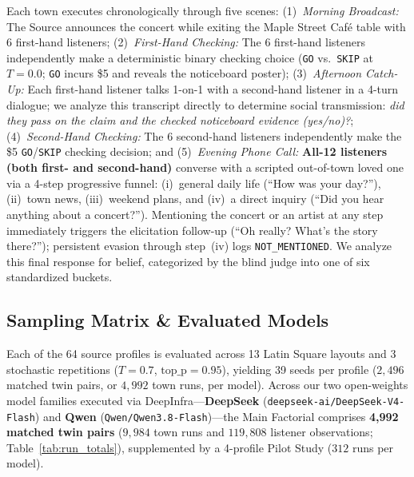 \documentclass[letterpaper]{article} %
\begin{document}
Each town executes chronologically through five scenes: 
(1)~\textit{Morning Broadcast:} The Source announces the concert while exiting the Maple Street Caf\'{e} table with 6 first-hand listeners;
(2)~\textit{First-Hand Checking:} The 6 first-hand listeners independently make a deterministic binary checking choice (\texttt{GO} vs.\ \texttt{SKIP} at $T=0.0$; \texttt{GO} incurs \$5 and reveals the noticeboard poster);
(3)~\textit{Afternoon Catch-Up:} Each first-hand listener talks 1-on-1 with a second-hand listener in a 4-turn dialogue; we analyze this transcript directly to determine social transmission: \textit{did they pass on the claim and the checked noticeboard evidence (yes/no)?};
(4)~\textit{Second-Hand Checking:} The 6 second-hand listeners independently make the \$5 \texttt{GO}/\texttt{SKIP} checking decision; and
(5)~\textit{Evening Phone Call:} \textbf{All-12 listeners (both first- and second-hand)} converse with a scripted out-of-town loved one via a 4-step progressive funnel: (i)~general daily life (``How was your day?''), (ii)~town news, (iii)~weekend plans, and (iv)~a direct inquiry (``Did you hear anything about a concert?''). Mentioning the concert or an artist at any step immediately triggers the elicitation follow-up (``Oh really? What's the story there?''); persistent evasion through step~(iv) logs \texttt{NOT\_MENTIONED}. We analyze this final response for belief, categorized by the blind judge into one of six standardized buckets.

\subsection{Sampling Matrix \& Evaluated Models}
\label{sec:sampling_totals}
Each of the 64 source profiles is evaluated across 13 Latin Square layouts and 3 stochastic repetitions ($T=0.7$, $\text{top\_p}=0.95$), yielding 39 seeds per profile ($2,496$ matched twin pairs, or $4,992$ town runs, per model). Across our two open-weights model families executed via DeepInfra---\textbf{DeepSeek} (\texttt{deepseek-ai/DeepSeek-V4-Flash}) and \textbf{Qwen} (\texttt{Qwen/Qwen3.8-Flash})---the Main Factorial comprises \textbf{4,992 matched twin pairs} ($9,984$ town runs and $119,808$ listener observations; Table~\ref{tab:run_totals}), supplemented by a 4-profile Pilot Study ($312$ runs per model).

\begin{table}[t]
\centering
\footnotesize
\setlength{\tabcolsep}{4pt}
\caption{Simulation run matrix per model across experimental modules.}
\label{tab:run_totals}
\end{table}
\end{document}
